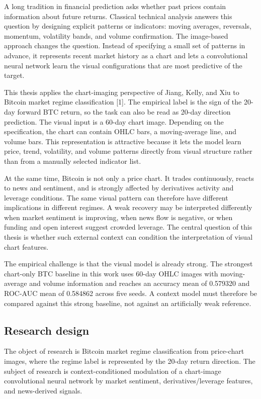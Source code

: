 \documentclass[14pt,a4paper]{extarticle}
\begin{document}
A long tradition in financial prediction asks whether past prices contain information about future returns. Classical technical analysis answers this question by designing explicit patterns or indicators: moving averages, reversals, momentum, volatility bands, and volume confirmation. The image-based approach changes the question. Instead of specifying a small set of patterns in advance, it represents recent market history as a chart and lets a convolutional neural network learn the visual configurations that are most predictive of the target.

This thesis applies the chart-imaging perspective of Jiang, Kelly, and Xiu to Bitcoin market regime classification [1]. The empirical label is the sign of the 20-day forward BTC return, so the task can also be read as 20-day direction prediction. The visual input is a 60-day chart image. Depending on the specification, the chart can contain OHLC bars, a moving-average line, and volume bars. This representation is attractive because it lets the model learn price, trend, volatility, and volume patterns directly from visual structure rather than from a manually selected indicator list.

At the same time, Bitcoin is not only a price chart. It trades continuously, reacts to news and sentiment, and is strongly affected by derivatives activity and leverage conditions. The same visual pattern can therefore have different implications in different regimes. A weak recovery may be interpreted differently when market sentiment is improving, when news flow is negative, or when funding and open interest suggest crowded leverage. The central question of this thesis is whether such external context can condition the interpretation of visual chart features.

The empirical challenge is that the visual model is already strong. The strongest chart-only BTC baseline in this work uses 60-day OHLC images with moving-average and volume information and reaches an accuracy mean of 0.579320 and ROC-AUC mean of 0.584862 across five seeds. A context model must therefore be compared against this strong baseline, not against an artificially weak reference.

\subsection{Research design}

The object of research is Bitcoin market regime classification from price-chart images, where the regime label is represented by the 20-day return direction. The subject of research is context-conditioned modulation of a chart-image convolutional neural network by market sentiment, derivatives/leverage features, and news-derived signals.
\end{document}
